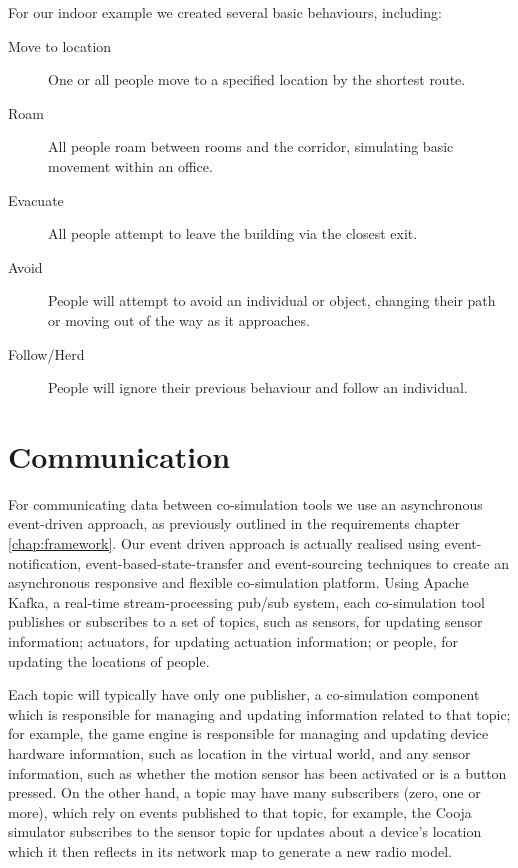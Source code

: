 For our indoor example we created several basic behaviours, including:

\begin{description}
  \item[Move to location] One or all people move to a specified location by the shortest route.
  \item[Roam] All people roam between rooms and the corridor, simulating basic movement within an office.
  \item[Evacuate] All people attempt to leave the building via the closest exit.
  \item[Avoid] People will attempt to avoid an individual or object, changing their path or moving out of the way as it approaches.
  \item[Follow/Herd] People will ignore their previous behaviour and follow an individual.
\end{description}

\section{Communication} %
\label{sec:communication}
For communicating data between co-simulation tools we use an asynchronous event-driven approach, as previously outlined in the requirements chapter \ref{chap:framework}. Our event driven approach is actually realised using event-notification, event-based-state-transfer and event-sourcing techniques\cite{eventSourcing,eventDriven} to create an asynchronous responsive and flexible co-simulation platform. Using Apache Kafka\cite{apacheKafka}, a real-time stream-processing pub/sub system, each co-simulation tool publishes or subscribes to a set of topics, such as sensors, for updating sensor information; actuators, for updating actuation information; or people, for updating the locations of people.

Each topic will typically have only one publisher, a co-simulation component which is responsible for managing and updating information related to that topic; for example, the game engine is responsible for managing and updating device hardware information, such as location in the virtual world, and any sensor information, such as whether the motion sensor has been activated or is a button pressed. On the other hand, a topic may have many subscribers (zero, one or more), which rely on events published to that topic, for example, the Cooja simulator subscribes to the sensor topic for updates about a device's location which it then reflects in its network map to generate a new radio model.

